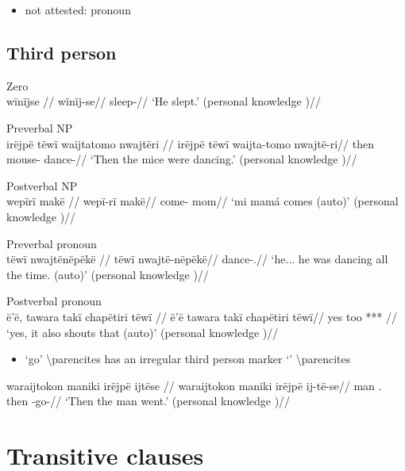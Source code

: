 \documentclass{memoir}
\begin{document}
\begin{itemize}
\tightlist
\item
  not attested: pronoun
\end{itemize}

\subsection{Third person}

\ex  Zero  \\\label{ctorat-6}
\begingl \glpreamble wïnïjse //
\gla wïnïj-se//
\glb sleep-//
\glft ‘He slept.’ (personal knowledge
)//
\endgl
\xe

\ex  Preverbal NP  \\\label{ctorat-16}
\begingl \glpreamble irëjpë tëwï waijtatomo nwajtëri //
\gla irëjpë tëwï waijta-tomo nwajtë-ri//
\glb then  mouse- dance-//
\glft ‘Then the mice were dancing.’ (personal knowledge
)//
\endgl
\xe

\ex  Postverbal NP  \\\label{histgrme-83}
\begingl \glpreamble wepïrï makë //
\gla wepï-rï makë//
\glb come- mom//
\glft ‘mi mamá comes (auto)’ (personal knowledge
)//
\endgl
\xe

\ex  Preverbal pronoun  \\\label{desccasagrme-28}
\begingl \glpreamble tëwï nwajtënëpëkë //
\gla tëwï nwajtë-nëpëkë//
\glb {} dance-.//
\glft ‘he... he was dancing all the time. (auto)’ (personal knowledge
)//
\endgl
\xe

\ex  Postverbal pronoun  \\\label{convfemgrme-113}
\begingl \glpreamble ë'ë, tawara takï chapëtiri tëwï //
\gla ë'ë tawara takï chapëtiri tëwï//
\glb yes too  *** //
\glft ‘yes, it also shouts that (auto)’ (personal knowledge
)//
\endgl
\xe

\begin{itemize}
\tightlist
\item
   `go' \textbackslash parencites has an irregular third person
  marker  `' \textbackslash parencites
\end{itemize}

\ex \label{ctorat-45}
\begingl \glpreamble waraijtokon maniki irëjpë ijtëse //
\gla waraijtokon maniki irëjpë ij-të-se//
\glb man . then -go-//
\glft ‘Then the man went.’ (personal knowledge
)//
\endgl
\xe

\section{Transitive clauses}
\end{document}

